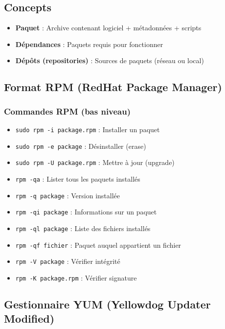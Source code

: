\documentclass[12pt,a4paper]{article}
\begin{document}
\subsection{Concepts}

\begin{itemize}
    \item \textbf{Paquet} : Archive contenant logiciel + métadonnées + scripts
    \item \textbf{Dépendances} : Paquets requis pour fonctionner
    \item \textbf{Dépôts (repositories)} : Sources de paquets (réseau ou local)
\end{itemize}

\subsection{Format RPM (RedHat Package Manager)}

\subsubsection{Commandes RPM (bas niveau)}
\begin{itemize}
    \item \texttt{sudo rpm -i package.rpm} : Installer un paquet
    \item \texttt{sudo rpm -e package} : Désinstaller (erase)
    \item \texttt{sudo rpm -U package.rpm} : Mettre à jour (upgrade)
    \item \texttt{rpm -qa} : Lister tous les paquets installés
    \item \texttt{rpm -q package} : Version installée
    \item \texttt{rpm -qi package} : Informations sur un paquet
    \item \texttt{rpm -ql package} : Liste des fichiers installés
    \item \texttt{rpm -qf fichier} : Paquet auquel appartient un fichier
    \item \texttt{rpm -V package} : Vérifier intégrité
    \item \texttt{rpm -K package.rpm} : Vérifier signature
\end{itemize}

\subsection{Gestionnaire YUM (Yellowdog Updater Modified)}
\end{document}
